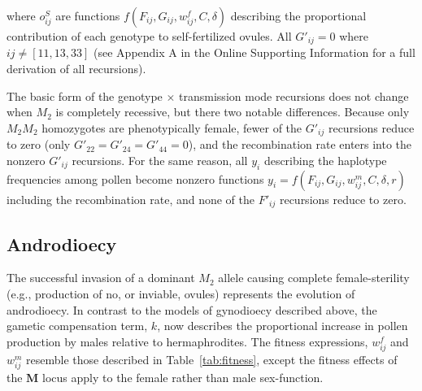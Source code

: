 \documentclass[9pt,twocolumn,twoside,lineno]{gsajnl}
\begin{document}
\noindent where $o^S_{ij}$ are functions $f(F_{ij},G_{ij},w^f_{ij},C,\delta)$ describing the proportional contribution of each genotype to self-fertilized ovules. All $G'_{ij} = 0$ where $ij \neq [11,13,33]$ (see Appendix A in the Online Supporting Information for a full derivation of all recursions). 

The basic form of the genotype $\times$ transmission mode recursions does not change when $M_2$ is completely recessive, but there two notable differences. Because only $M_2M_2$ homozygotes are phenotypically female, fewer of the $G'_{ij}$ recursions reduce to zero (only $G'_{22}=G'_{24}=G'_{44}=0$), and the recombination rate enters into the nonzero $G'_{ij}$ recursions. For the same reason, all $y_i$ describing the haplotype frequencies among pollen become nonzero functions $y_i=f(F_{ij},G_{ij},w^m_{ij},C,\delta,r)$ including the recombination rate, and none of the $F'_{ij}$ recursions reduce to zero.


\subsection{Androdioecy}

The successful invasion of a dominant $M_2$ allele causing complete female-sterility (e.g., production of no, or inviable, ovules) represents the evolution of androdioecy. In contrast to the models of gynodioecy described above, the gametic compensation term, $k$, now describes the proportional increase in pollen production by males relative to hermaphrodites. The fitness expressions, $w^f_{ij}$ and $w^m_{ij}$ resemble those described in Table~\ref{tab:fitness}, except the fitness effects of the $\mathbf{M}$ locus apply to the female rather than male sex-function. 
\end{document}
